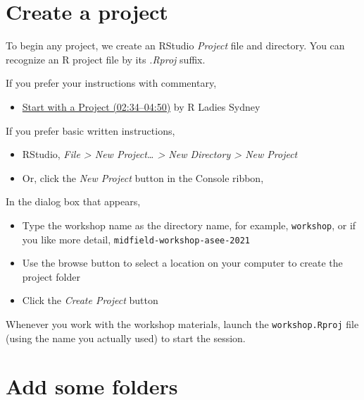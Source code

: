 \documentclass[
]{book}
\providecommand{\tightlist}{%
  \setlength{\itemsep}{0pt}\setlength{\parskip}{0pt}}
\begin{document}
\hypertarget{create-a-project}{%
\section{Create a project}\label{create-a-project}}

To begin any project, we create an RStudio \emph{Project} file and directory. You can recognize an R project file by its \emph{.Rproj} suffix.

If you prefer your instructions with commentary,

\begin{itemize}
\tightlist
\item
  \href{https://www.youtube.com/embed/kfcX5DEMAp4?start=154\&end=290}{Start with a Project (02:34--04:50)} by R Ladies Sydney \citep{RLadiesSydney:2018:Lesson1}
\end{itemize}

If you prefer basic written instructions,

\begin{itemize}
\tightlist
\item
  RStudio, \emph{File \textgreater{} New Project\ldots{} \textgreater{} New Directory \textgreater{} New Project}
\item
  Or, click the \emph{New Project} button in the Console ribbon,
\end{itemize}

In the dialog box that appears,

\begin{itemize}
\tightlist
\item
  Type the workshop name as the directory name, for example, \texttt{workshop}, or if you like more detail, \texttt{midfield-workshop-asee-2021}\\
\item
  Use the browse button to select a location on your computer to create the project folder\\
\item
  Click the \emph{Create Project} button
\end{itemize}

Whenever you work with the workshop materials, launch the \texttt{workshop.Rproj} file (using the name you actually used) to start the session.

\hypertarget{add-some-folders}{%
\section{Add some folders}\label{add-some-folders}}
\end{document}
